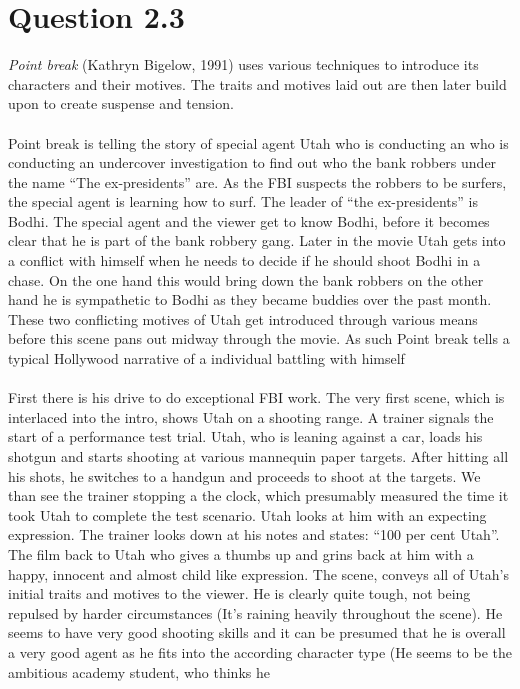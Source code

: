 \documentclass[fleqn,14pt]{article}
\begin{document}
\section{Question 2.3}
\textit{Point break} (Kathryn Bigelow, 1991) uses various techniques to introduce its characters and their motives.
The traits and motives laid out are then later build upon to create suspense and tension.\\
\\
Point break is telling the story of special agent Utah who is conducting an who is conducting an undercover investigation to find out who the bank robbers under the name 
“The ex-presidents” are. As the FBI suspects the robbers to be surfers, the special agent is learning how to surf. 
The leader of “the ex-presidents” is Bodhi. The special agent and the viewer get to know Bodhi, before
it becomes clear that he is part of the bank robbery gang. Later in the movie Utah gets into a conflict with himself
when he needs to decide if he should shoot Bodhi in a chase. On the one hand this would bring down the bank robbers on
the other hand he is sympathetic to Bodhi as they became buddies over the past month. These two conflicting motives of Utah get introduced
through various means before this scene pans out midway through the movie. As such Point break tells a typical Hollywood narrative of a individual battling with
himself \cite[p. 94]{Bordwell} \\
\\
First there is his drive to do exceptional FBI work. The very first scene, which is interlaced into the intro, shows Utah on a shooting range.
A trainer signals the start of a performance test trial. Utah, who is leaning against a car, loads his shotgun and starts shooting at various mannequin paper targets.
After hitting all his shots, he switches to a handgun and proceeds to shoot at the targets. We than see the trainer stopping a the clock, which presumably measured the time it
took Utah to complete the test scenario. Utah looks at him with an expecting expression. The trainer looks down at his notes and states: 
“100 per cent Utah”. The film back to Utah who gives a thumbs up and grins back at him with a happy, innocent and almost child like expression. The scene, conveys all of Utah's initial 
traits and motives to the viewer. He is clearly quite tough, not being repulsed by harder circumstances (It's raining heavily throughout the scene). He seems to have very good shooting
skills and it can be presumed that he is overall a very good agent as he fits into the according character type\cite[p. 257]{Cor} (He seems to be the ambitious academy student, who thinks he
\end{document}
